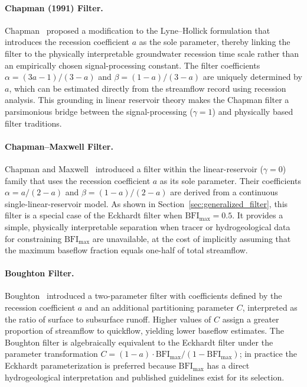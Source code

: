 \documentclass[hydrology,article,submit,pdftex,moreauthors]{Definitions/mdpi}
\begin{document}
\paragraph{Chapman (1991) Filter.}
Chapman~\cite{Chapman1991} proposed a modification to the Lyne--Hollick formulation that introduces the recession coefficient $a$ as the sole parameter, thereby linking the filter to the physically interpretable groundwater recession time scale rather than an empirically chosen signal-processing constant. The filter coefficients $\alpha = (3a-1)/(3-a)$ and $\beta = (1-a)/(3-a)$ are uniquely determined by $a$, which can be estimated directly from the streamflow record using recession analysis. This grounding in linear reservoir theory makes the Chapman filter a parsimonious bridge between the signal-processing ($\gamma = 1$) and physically based filter traditions.

\paragraph{Chapman--Maxwell Filter.}
Chapman and Maxwell~\cite{ChapmanMaxwell1996} introduced a filter within the linear-reservoir ($\gamma = 0$) family that uses the recession coefficient $a$ as its sole parameter. Their coefficients $\alpha = a/(2-a)$ and $\beta = (1-a)/(2-a)$ are derived from a continuous single-linear-reservoir model. As shown in Section~\ref{sec:generalized_filter}, this filter is a special case of the Eckhardt filter when $\mathrm{BFI_{max}} = 0.5$. It provides a simple, physically interpretable separation when tracer or hydrogeological data for constraining $\mathrm{BFI_{max}}$ are unavailable, at the cost of implicitly assuming that the maximum baseflow fraction equals one-half of total streamflow.

\paragraph{Boughton Filter.}
Boughton~\cite{Boughton1993} introduced a two-parameter filter with coefficients defined by the recession coefficient $a$ and an additional partitioning parameter $C$, interpreted as the ratio of surface to subsurface runoff. Higher values of $C$ assign a greater proportion of streamflow to quickflow, yielding lower baseflow estimates. The Boughton filter is algebraically equivalent to the Eckhardt filter under the parameter transformation $C = (1-a)\cdot\mathrm{BFI_{max}}/(1-\mathrm{BFI_{max}})$; in practice the Eckhardt parameterization is preferred because $\mathrm{BFI_{max}}$ has a direct hydrogeological interpretation and published guidelines exist for its selection.
\end{document}
